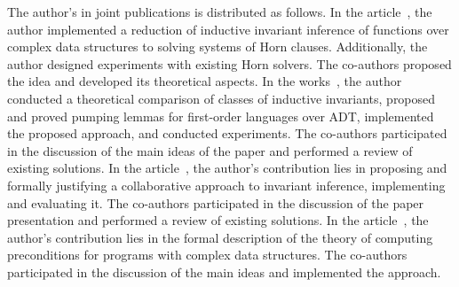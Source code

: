 The author's {\contribution} in joint publications is distributed as follows.
In the article~\cite{костюков2019автоматическое}, the author implemented a reduction of inductive invariant inference of functions over complex data structures to solving systems of Horn clauses. Additionally, the author designed experiments with existing Horn solvers. The co-authors proposed the idea and developed its theoretical aspects.
In the works~\cite{https://doi.org/10.48550/arxiv.2108.00225,10.1145/3453483.3454055}, the author conducted a theoretical comparison of classes of inductive invariants, proposed and proved pumping lemmas for first-order languages over ADT, implemented the proposed approach, and conducted experiments. The co-authors participated in the discussion of the main ideas of the paper and performed a review of existing solutions.
In the article~\cite{LPAR2023:Collaborative_Inference_of_Combined}, the author's contribution lies in proposing and formally justifying a collaborative approach to invariant inference, implementing and evaluating it. The co-authors participated in the discussion of the paper presentation and performed a review of existing solutions.
In the article~\cite{мисонижник2022генерация}, the author's contribution lies in the formal description of the theory of computing preconditions for programs with complex data structures. The co-authors participated in the discussion of the main ideas and implemented the approach.
